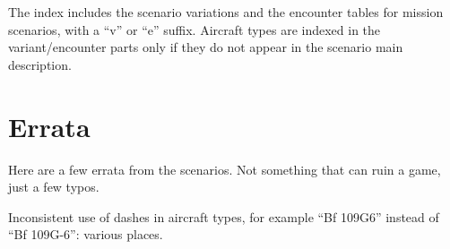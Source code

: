 \documentclass[a4paper,twocolumn]{article}
\begin{document}
The index includes the scenario variations and the encounter
tables for mission scenarios, with a ``v'' or ``e''
suffix. Aircraft types are indexed in the variant/encounter parts only if they do not appear in the
scenario main description.

\vspace{1mm}


\section*{Errata}

Here are a few errata from the scenarios. Not something that can ruin a game, just
a few typos.

\vspace{1mm}

Inconsistent use of dashes in aircraft types, for example ``Bf 109G6''
instead of  ``Bf 109G-6'': various places.

\end{document}
